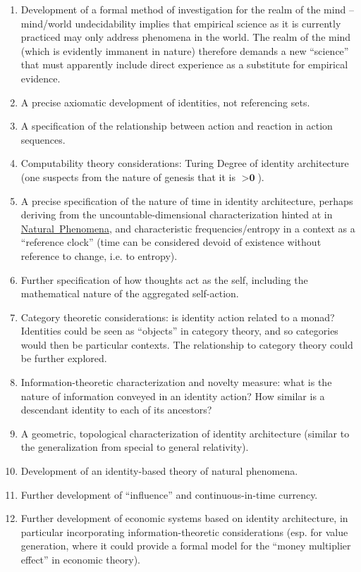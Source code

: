 \documentclass[pra,twocolumn,groupedaddress,10pt]{revtex4}
\theoremstyle{definition}
\begin{document}
\begin{enumerate}
	\item Development of a formal method of investigation for the realm of the mind -- mind/world undecidability implies that empirical science as it is currently practiced may only address phenomena in the world. The realm of the mind (which is evidently immanent in nature) therefore demands a new ``science'' that must apparently include direct experience as a substitute for empirical evidence.
	\item A precise axiomatic development of identities, not referencing sets.
	\item A specification of the relationship between action and reaction in action sequences.
	\item Computability theory considerations: Turing Degree of identity architecture (one suspects from the nature of genesis that it is $> \textbf{0}$).
	\item A precise specification of the nature of time in identity architecture, perhaps deriving from the uncountable-dimensional characterization hinted at in \hyperref[sec:natphe]{Natural~Phenomena}, and characteristic frequencies/entropy in a context as a ``reference clock'' (time can be considered devoid of existence without reference to change, i.e. to entropy).
	\item Further specification of how thoughts act as the self, including the mathematical nature of the aggregated self-action.
	\item Category theoretic considerations: is identity action related to a monad? Identities could be seen as ``objects'' in category theory, and so categories would then be particular contexts. The relationship to category theory could be further explored.
	\item Information-theoretic characterization and novelty measure: what is the nature of information conveyed in an identity action? How similar is a descendant identity to each of its ancestors?
	\item A geometric, topological characterization of identity architecture (similar to the generalization from special to general relativity).
	\item Development of an identity-based theory of natural phenomena.
	\item Further development of ``influence'' and continuous-in-time currency.
	\item Further development of economic systems based on identity architecture, in particular incorporating information-theoretic considerations (esp. for value generation, where it could provide a formal model for the ``money multiplier effect'' in economic theory).

\end{enumerate}
\end{document}
